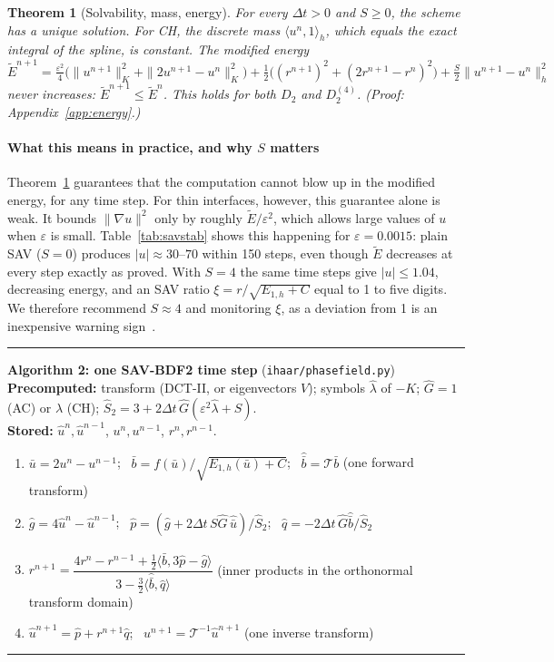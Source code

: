 \documentclass[preprint,12pt]{elsarticle}
\newtheorem{theorem}{Theorem}
\theoremstyle{remark}
\newcommand{\proofin}[1]{\hfill{\small\emph{(Proof: Appendix~\ref{#1}.)}}}
\begin{document}
\begin{theorem}[Solvability, mass, energy]\label{thm:energy}
For every $\Delta t>0$ and $S\ge0$, the scheme has a unique solution. For CH, the discrete mass
$\langle u^n,1\rangle_h$, which equals the exact integral of the spline, is constant. The modified energy
\[
\tilde E^{n+1}=\tfrac{\varepsilon^2}{4}\big(\|u^{n+1}\|_K^2+\|2u^{n+1}-u^n\|_K^2\big)
+\tfrac12\big((r^{n+1})^2+(2r^{n+1}-r^n)^2\big)+\tfrac S2\|u^{n+1}-u^n\|_h^2
\]
never increases: $\tilde E^{n+1}\le\tilde E^n$. This holds for both $D_2$ and $D_2^{(4)}$.
\proofin{app:energy}
\end{theorem}

\paragraph{What this means in practice, and why $S$ matters}
Theorem~\ref{thm:energy} guarantees that the computation cannot blow up in the modified energy, for any
time step. For thin interfaces, however, this guarantee alone is weak. It bounds
$\|\nabla u\|^2$ only by roughly $\tilde E/\varepsilon^2$, which allows large values of $u$ when
$\varepsilon$ is small. Table~\ref{tab:savstab} shows this happening for $\varepsilon=0.0015$: plain SAV
($S=0$) produces $|u|\approx 30$--$70$ within 150 steps, even though $\tilde E$ decreases at every step
exactly as proved. With $S=4$ the same time steps give $|u|\le1.04$, decreasing energy, and an SAV
ratio $\xi=r/\sqrt{E_{1,h}+C}$ equal to 1 to five digits. We therefore recommend $S\approx4$ and
monitoring $\xi$, as a deviation from 1 is an inexpensive warning sign~\cite{shen2018scalar}.

\begin{algorithm}[t]\small\hrule\smallskip
\textbf{Algorithm 2: one SAV-BDF2 time step} (\texttt{ihaar/phasefield.py})\\[2pt]
\textbf{Precomputed:} transform (DCT-II, or eigenvectors $V$); symbols $\hat\lambda$ of $-K$;
$\hat G=1$ (AC) or $\hat\lambda$ (CH); $\hat S_2=3+2\Delta t\,\hat G(\varepsilon^2\hat\lambda+S)$.\\
\textbf{Stored:} $\hat u^n,\hat u^{n-1}$, $u^n,u^{n-1}$, $r^n,r^{n-1}$.
\begin{enumerate}
\item $\bar u=2u^n-u^{n-1}$; \ $\bar b=f(\bar u)/\sqrt{E_{1,h}(\bar u)+C}$; \ $\hat{\bar b}=\mathcal T\bar b$ \hfill (one forward transform)
\item $\hat g=4\hat u^n-\hat u^{n-1}$; \ $\hat p=(\hat g+2\Delta t\,S\hat G\,\hat{\bar u})/\hat S_2$; \ $\hat q=-2\Delta t\,\hat G\hat{\bar b}/\hat S_2$
\item $r^{n+1}=\dfrac{4r^n-r^{n-1}+\tfrac12\langle\hat{\bar b},3\hat p-\hat g\rangle}{3-\tfrac32\langle\hat{\bar b},\hat q\rangle}$ \hfill (inner products in the orthonormal transform domain)
\item $\hat u^{n+1}=\hat p+r^{n+1}\hat q$; \ $u^{n+1}=\mathcal T^{-1}\hat u^{n+1}$ \hfill (one inverse transform)
\end{enumerate}
\hrule
\end{algorithm}
\end{document}
